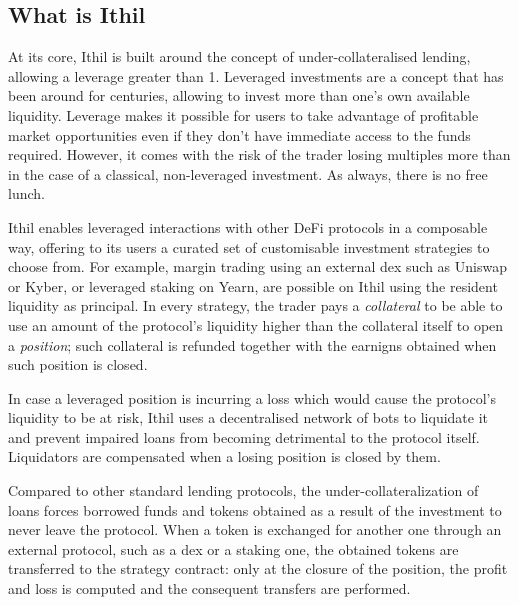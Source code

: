 \documentclass[a4paper,10 pt]{article}
\theoremstyle{definition}
\begin{document}
\subsection{What is Ithil}

At its core, Ithil is built around the concept of under-collateralised lending, allowing a leverage greater than 1.
Leveraged investments are a concept that has been around for centuries, allowing to invest more than one's own available liquidity. Leverage makes it possible for users to take advantage of profitable market opportunities even if they don't have immediate access to the funds required. However, it comes with the risk of the trader losing multiples more than in the case of a classical, non-leveraged investment. As always, there is no free lunch.

Ithil enables leveraged interactions with other DeFi protocols in a composable way, offering to its users a curated set of customisable investment strategies to choose from. For example, margin trading using an external dex such as Uniswap or Kyber, or leveraged staking on Yearn, are possible on Ithil using the resident liquidity as principal. In every strategy, the trader pays a {\it collateral} to be able to use an amount of the protocol's liquidity higher than the collateral itself to open a {\it position}; such collateral is refunded together with the earnigns obtained when such position is closed.

In case a leveraged position is incurring a loss which would cause the protocol's liquidity to be at risk, Ithil uses a decentralised network of bots to liquidate it and prevent impaired loans from becoming detrimental to the protocol itself. Liquidators are compensated when a losing position is closed by them.

Compared to other standard lending protocols, the under-collateralization of loans forces borrowed funds and tokens obtained as a result of the investment to never leave the protocol. When a token is exchanged for another one through an external protocol, such as a dex or a staking one, the obtained tokens are transferred to the strategy contract: only at the closure of the position, the profit and loss is computed and the consequent transfers are performed.
\end{document}
